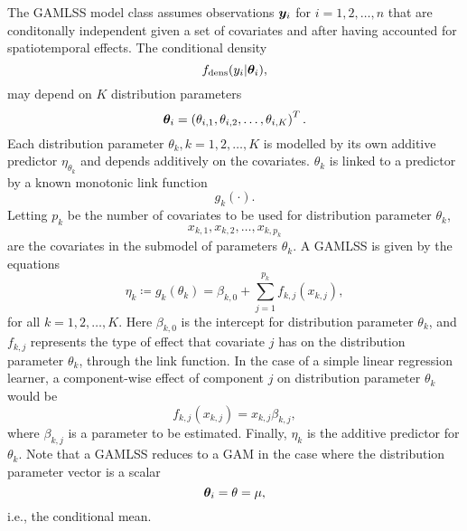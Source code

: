 The GAMLSS model class assumes observations $\bm{y}_i$ for $i=1,2,\ldots,n$ that are conditonally independent given a set of
covariates and after having accounted for spatiotemporal effects. The conditional density
\begin{equation}\label{gamlss-density}
    f_{\text{dens}}(y_i|\boldsymbol{\theta}_i),
\end{equation}
may depend on $K$ distribution parameters
\begin{equation}
    \boldsymbol{\theta}_i=\left(\theta_{i,1},\theta_{i,2},\ldots,\theta_{i,K}\right)^T.
\end{equation}
Each distribution parameter $\theta_k,k=1,2,\ldots,K$ is modelled by its own additive predictor $\eta_{\theta_k}$ and depends additively
on the covariates. $\theta_k$ is linked to a predictor by a known monotonic link function
\begin{equation}
    g_k(\cdot).
\end{equation}
Letting $p_k$ be the number of covariates to be used for distribution parameter $\theta_k$,
\begin{equation}
    x_{k,1},x_{k,2},\ldots,x_{k,p_k}
\end{equation}
are the covariates in the submodel of parameters $\theta_k$. A GAMLSS is given by the equations
\begin{equation}
    \eta_k\coloneqq g_k(\theta_k)=\beta_{k,0}+\sum_{j=1}^{p_k}f_{k,j}(x_{k,j}),
\end{equation}
for all $k=1,2,\ldots,K$. Here $\beta_{k,0}$ is the intercept for distribution parameter $\theta_k$, and $f_{k,j}$
represents the type of effect that covariate $j$ has on the distribution parameter $\theta_k$, through the link function.
In the case of a simple linear regression learner, a component-wise effect of component $j$ on distribution parameter $\theta_k$ would be
\begin{equation}
    f_{k,j}(x_{k,j})=x_{k,j}\beta_{k,j},
\end{equation}
where $\beta_{k,j}$ is a parameter to be estimated.
Finally, $\eta_{k}$ is the additive predictor for $\theta_k$.
Note that a GAMLSS reduces to a GAM \citep{gam-book} in the case where the distribution parameter vector is a scalar
\begin{equation}
    \boldsymbol{\theta}_i=\theta=\mu,
\end{equation}
i.e., the conditional mean.

